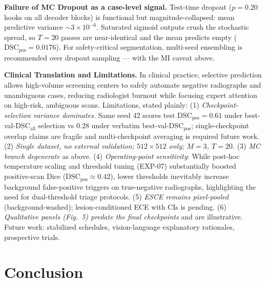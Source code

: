 \documentclass[11pt,a4paper]{article}
\begin{document}
\textbf{Failure of MC Dropout as a case-level signal.} Test-time dropout ($p = 0.20$ hooks on all decoder blocks) is functional but magnitude-collapsed: mean predictive variance $\sim$$3 \times 10^{-6}$. Saturated sigmoid outputs crush the stochastic spread, so $T=20$ passes are near-identical and the mean predicts empty ($\text{DSC}_{\text{pos}} = 0.0176$). For safety-critical segmentation, multi-seed ensembling is recommended over dropout sampling — with the MI caveat above.

\textbf{Clinical Translation and Limitations.} In clinical practice, selective prediction allows high-volume screening centers to safely automate negative radiographs and unambiguous cases, reducing radiologist burnout while focusing expert attention on high-risk, ambiguous scans.
Limitations, stated plainly: (1) \emph{Checkpoint-selection variance dominates.} Same seed 42 scores test $\text{DSC}_{\text{pos}} = 0.61$ under best-val-$\text{DSC}_{\text{all}}$ selection vs $0.28$ under verbatim best-val-$\text{DSC}_{\text{pos}}$; single-checkpoint overlap claims are fragile and multi-checkpoint averaging is required future work. (2) \emph{Single dataset, no external validation; $512 \times 512$ only; $M=3$, $T=20$.} (3) \emph{MC branch degenerate} as above. (4) \emph{Operating-point sensitivity}: While post-hoc temperature scaling and threshold tuning (EXP-07) substantially boosted positive-scan Dice ($\text{DSC}_{\text{pos}} \approx 0.42$), lower thresholds inevitably increase background false-positive triggers on true-negative radiographs, highlighting the need for dual-threshold triage protocols. (5) \emph{ESCE remains pixel-pooled} (background-washed); lesion-conditioned ECE with CIs is pending. (6) \emph{Qualitative panels (Fig.~5) predate the final checkpoints} and are illustrative. Future work: stabilized schedules, vision-language explanatory rationales, prospective trials.

\section{Conclusion}
\label{sec:conclusion}
\end{document}

